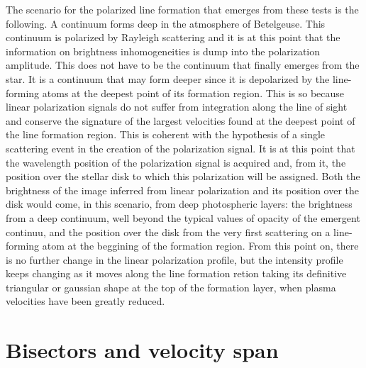 \documentclass{/Users/art2/TeX/aanda/aa}
\begin{document}
The scenario for the polarized line formation that emerges from these tests is the following. A continuum forms deep in the atmosphere of Betelgeuse. This continuum is 
polarized by Rayleigh scattering and it is at this point that the information on brightness inhomogeneities is dump into the polarization amplitude. 
This does not have to be the continuum that finally emerges from the star. It is a continuum that may form deeper since it is depolarized by the line-forming atoms 
at the deepest point of its formation region. This is so because linear polarization signals do not suffer from integration along the line of sight and conserve 
the signature of the largest velocities found at the deepest point of the line formation region. This is coherent with the hypothesis of a single 
scattering event in the creation of the polarization signal. It is at this point that the wavelength position of the polarization signal is acquired and,
from it, the position over the stellar disk to which this polarization will be assigned. Both the brightness of the image inferred from linear polarization 
and its position over the disk would come, in this scenario, from deep photospheric layers: the brightness from a deep continuum, well beyond the 
typical values of opacity of the emergent continuu, and the position over the disk from the very first scattering on a line-forming atom at the beggining 
of the formation region.   From this point on, there is no further change in the linear polarization profile, but the intensity profile keeps changing 
as it moves along the line formation retion taking its definitive triangular or gaussian shape at the top of the formation layer, when plasma velocities 
have been greatly reduced. 


\section{Bisectors and velocity span}
\end{document}
